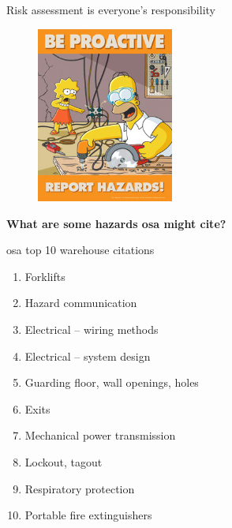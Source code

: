 \documentclass[aspectratio=1610,pdftex,dvipsnames,compress,xcolor={dvipsnames}]{beamer}
\newcommand{\acs}{\acrshort} %
\begin{document}
\begin{frame}{Risk assessment is everyone's responsibility}
    \begin{figure}
        \centering
        \includegraphics[width=0.40\textwidth]{simpsons.jpg}
    \end{figure}
\end{frame}


\begin{frame}[plain]{}
    \centering\Large\textbf{What are some hazards \acs{osa} might cite?}
\end{frame}


\addtocounter{framenumber}{-1}
\begin{frame}{\acs{osa} top 10 warehouse citations}
    \begin{enumerate}[series=outerlist,topsep=0pt,itemsep=5pt,leftmargin=*,label=(\arabic*)]
        \item Forklifts 
        \item Hazard communication
        \item Electrical -- wiring methods
        \item Electrical -- system design
        \item Guarding floor, wall openings, holes
        \item Exits
        \item Mechanical power transmission
        \item Lockout, tagout
        \item Respiratory protection
        \item Portable fire extinguishers
    \end{enumerate}
\end{frame}
\end{document}
